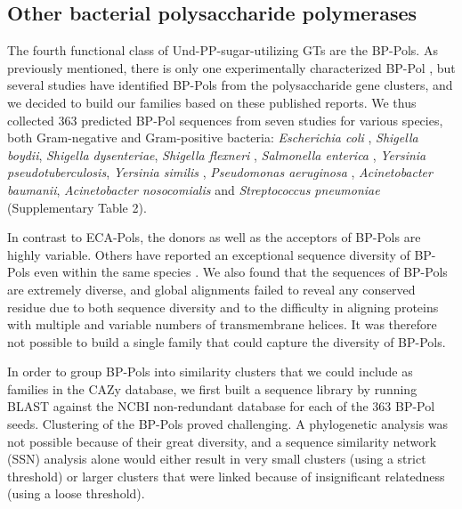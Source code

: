 \documentclass{article}
\begin{document}
\subsection{Other bacterial polysaccharide polymerases}

The fourth functional class of Und-PP-sugar-utilizing GTs are the BP-Pols. As previously mentioned, there is only one experimentally characterized BP-Pol \cite{woodward_vitro_2010}, but several studies have identified BP-Pols from the polysaccharide gene clusters, and we decided to build our families based on these published reports. We thus collected 363 predicted BP-Pol sequences from seven studies for various species, both Gram-negative and Gram-positive bacteria: \textit{Escherichia coli} \cite{iguchi_complete_2015}, \textit{Shigella boydii}, \textit{Shigella dysenteriae}, \textit{Shigella flexneri} \cite{liu_structure_2008}, \textit{Salmonella enterica} \cite{liu_structural_2014}, \textit{Yersinia pseudotuberculosis}, \textit{Yersinia similis} \cite{kenyon_genetics_2017}, \textit{Pseudomonas aeruginosa} \cite{islam_synthesis_2014}, \textit{Acinetobacter baumanii}, \textit{Acinetobacter nosocomialis} \cite{hu_diversity_2013} and
\textit{Streptococcus pneumoniae} \cite{bentley_genetic_2006} (Supplementary Table 2).

In contrast to ECA-Pols, the donors as well as the acceptors of BP-Pols are highly variable. Others have reported an exceptional sequence diversity of BP-Pols even within the same species \cite{islam_synthesis_2014}. We also found that the sequences of BP-Pols are extremely diverse, and global alignments failed to reveal any conserved residue due to both sequence diversity and to the difficulty in aligning proteins with multiple and variable numbers of transmembrane helices. It was therefore not possible to build a single family that could capture the diversity of BP-Pols.

In order to group BP-Pols into similarity clusters that we could include as families in the CAZy database, we first built a sequence library by running BLAST against the NCBI non-redundant database for each of the 363 BP-Pol seeds. Clustering of the BP-Pols proved challenging. A phylogenetic analysis was not possible because of their great diversity, and a sequence similarity network (SSN) analysis alone would either result in very small clusters (using a strict threshold) or larger clusters that were linked because of insignificant relatedness (using a loose threshold).
\end{document}
